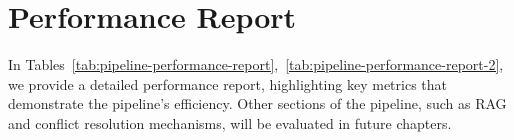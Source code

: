 \section{Performance Report}\label{sec:performance-report}
In Tables~\ref{tab:pipeline-performance-report},~\ref{tab:pipeline-performance-report-2}, we provide a detailed performance report, highlighting key metrics that demonstrate the pipeline's efficiency.
Other sections of the pipeline, such as RAG and conflict resolution mechanisms, will be evaluated in future chapters.
\begin{table}[ht!]
    \noindent
    \caption{Performance of our LLM-based tasks in production, generated by Openlit~\footnote{\url{https://openlit.io/}} with \textit{Gemma2} model.}
    \label{tab:pipeline-performance-report}
\end{table}
